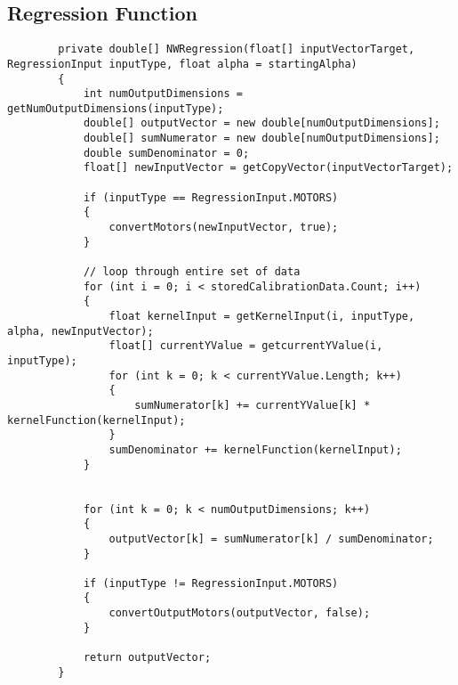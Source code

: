 \subsection{Regression Function}
\lstset{language=[Sharp]C}
\begin{lstlisting}
        private double[] NWRegression(float[] inputVectorTarget, RegressionInput inputType, float alpha = startingAlpha)
        {
            int numOutputDimensions = getNumOutputDimensions(inputType);
            double[] outputVector = new double[numOutputDimensions];
            double[] sumNumerator = new double[numOutputDimensions];
            double sumDenominator = 0;
            float[] newInputVector = getCopyVector(inputVectorTarget);
           
            if (inputType == RegressionInput.MOTORS)
            {
                convertMotors(newInputVector, true);
            }

            // loop through entire set of data
            for (int i = 0; i < storedCalibrationData.Count; i++)
            {
                float kernelInput = getKernelInput(i, inputType, alpha, newInputVector);
                float[] currentYValue = getcurrentYValue(i, inputType);
                for (int k = 0; k < currentYValue.Length; k++)
                {
                    sumNumerator[k] += currentYValue[k] * kernelFunction(kernelInput);
                }
                sumDenominator += kernelFunction(kernelInput);
            }


            for (int k = 0; k < numOutputDimensions; k++)
            {
                outputVector[k] = sumNumerator[k] / sumDenominator;
            }

            if (inputType != RegressionInput.MOTORS)
            {
                convertOutputMotors(outputVector, false);
            }

            return outputVector;
        }
\end{lstlisting}

\pagebreak
